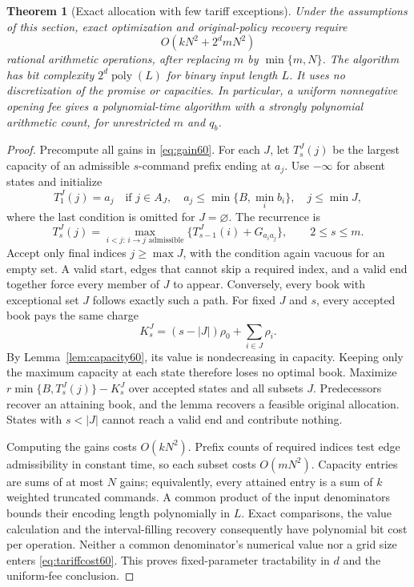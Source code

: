\documentclass[11pt,letterpaper]{article}
\newtheorem{theorem}{Theorem}[section]
\theoremstyle{definition}\newtheorem{remark}[theorem]{Remark}
\begin{document}
\begin{theorem}[Exact allocation with few tariff exceptions]\label{thm:tariff60}
Under the assumptions of this section, exact optimization and original-policy recovery require
\begin{equation}\label{eq:tariffcost60}
 O(kN^2+2^d mN^2)
\end{equation}
rational arithmetic operations, after replacing $m$ by $\min\{m,N\}$. The algorithm has bit complexity $2^d\operatorname{poly}(L)$ for binary input length $L$. It uses no discretization of the promise or capacities. In particular, a uniform nonnegative opening fee gives a polynomial-time algorithm with a strongly polynomial arithmetic count, for unrestricted $m$ and $q_b$.
\end{theorem}
\begin{proof}
Precompute all gains in \eqref{eq:gain60}. For each $J$, let $T^J_s(j)$ be the largest capacity of an admissible $s$-command prefix ending at $a_j$. Use $-\infty$ for absent states and initialize
\[
 T^J_1(j)=a_j
 \quad\text{if }j\in A_J,\quad a_j\leq\min\{B,\min_i b_i\},
 \quad j\leq\min J,
\]
where the last condition is omitted for $J=\varnothing$. The recurrence is
\begin{equation}\label{eq:tariffdp60}
 T^J_s(j)=\max_{i<j:\,i\to j\text{ admissible}}
       \{T^J_{s-1}(i)+G_{a_i a_j}\},\qquad 2\leq s\leq m.
\end{equation}
Accept only final indices $j\geq\max J$, with the condition again vacuous for an empty set. A valid start, edges that cannot skip a required index, and a valid end together force every member of $J$ to appear. Conversely, every book with exceptional set $J$ follows exactly such a path. For fixed $J$ and $s$, every accepted book pays the same charge
\[
 K^J_s=(s-|J|)\rho_0+\sum_{i\in J}\rho_i.
\]
By Lemma~\ref{lem:capacity60}, its value is nondecreasing in capacity. Keeping only the maximum capacity at each state therefore loses no optimal book. Maximize $r\min\{B,T^J_s(j)\}-K^J_s$ over accepted states and all subsets $J$. Predecessors recover an attaining book, and the lemma recovers a feasible original allocation. States with $s<|J|$ cannot reach a valid end and contribute nothing.

Computing the gains costs $O(kN^2)$. Prefix counts of required indices test edge admissibility in constant time, so each subset costs $O(mN^2)$. Capacity entries are sums of at most $N$ gains; equivalently, every attained entry is a sum of $k$ weighted truncated commands. A common product of the input denominators bounds their encoding length polynomially in $L$. Exact comparisons, the value calculation and the interval-filling recovery consequently have polynomial bit cost per operation. Neither a common denominator's numerical value nor a grid size enters \eqref{eq:tariffcost60}. This proves fixed-parameter tractability in $d$ and the uniform-fee conclusion.
\end{proof}
\end{document}
